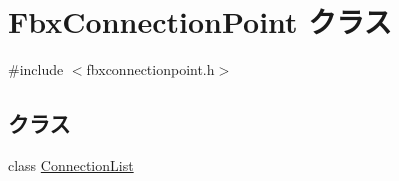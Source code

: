 \hypertarget{class_fbx_connection_point}{}\section{Fbx\+Connection\+Point クラス}
\label{class_fbx_connection_point}


{\ttfamily \#include $<$fbxconnectionpoint.\+h$>$}

\subsection*{クラス}
\begin{DoxyCompactItemize}
\item 
class \hyperlink{class_fbx_connection_point_1_1_connection_list}{Connection\+List}
\end{DoxyCompactItemize}
